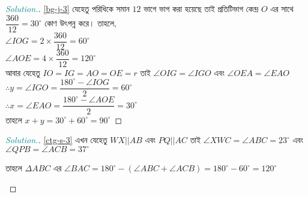 \documentclass[a4paper,11pt]{article}
\newcommand{\drg}{^{\circ}}
\newenvironment{sltn}{\begin{proof}[\emph{\textcolor{darkcyan}{Solution.}}]} {\end{proof}}
\begin{document}
\begin{Answer}[ref={agl-ex-1}]
	\begin{sltn}\ref{bg-j-3}
		যেহেতু পরিধিকে সমান $12$ ভাগে ভাগ করা হয়েছে তাই প্রতিটিভাগ কেন্দ্র $O$ এর সাথে $\dfrac{360}{12}=30\drg$ কোণ উৎপন্ন করে। তাহলে, \\
		$\angle IOG = 2\times \dfrac{360}{12}=60\drg$\\
		$\angle AOE = 4 \times \dfrac{360}{12}=120\drg$\\
		আবার যেহেতু $IO=IG=AO=OE=r$ তাই $\angle OIG= \angle IGO$ এবং $\angle OEA = \angle EAO$\\
		$\therefore y=\angle IGO = \dfrac{180\drg-\angle IOG}{2}=60\drg$\\
		$\therefore x=\angle EAO= \dfrac{180\drg-\angle AOE}{2}=30\drg$\\
		তাহলে $x+y=30\drg+60\drg=90\drg$
	\end{sltn}
	\begin{sltn}\ref{ctg-s-3}
		এখন যেহেতু $WX||AB$ এবং $PQ||AC$ তাই $\angle XWC=\angle ABC=23\drg$ এবং $\angle QPB=\angle ACB=37\drg$
		
		তাহলে $\Delta ABC$ এর $\angle BAC=180\drg-(\angle ABC+\angle ACB)=180\drg-60\drg=120\drg$
		\begin{center}
		\end{center}
	\end{sltn}
\end{Answer}
\newpage
\end{document}
